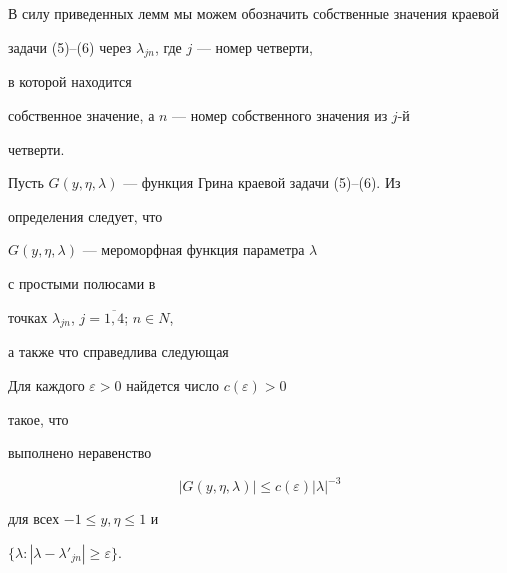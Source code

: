  


В силу приведенных лемм мы можем обозначить собственные значения краевой 


задачи (5)--(6) через $\lambda_{jn}$, где $j$ --- номер четверти, 


в которой находится 


собственное значение, а $n$ --- номер собственного значения из $j$-й 


четверти. 


 


Пусть $G(y,\eta,\lambda)$ --- функция Грина краевой задачи (5)--(6). Из 


определения следует, что 


$G(y,\eta,\lambda)$ --- мероморфная функция параметра $\lambda$ 


с простыми полюсами в 


точках $\lambda_{jn}$, $j=\overline{1,4}$; $n \in N$, 


а также что справедлива следующая 


 


\begin{lem} Для каждого $\varepsilon>0$ найдется число $c(\varepsilon)>0$ 


такое, что 


выполнено неравенство 


\begin{equation} 


|G(y,\eta,\lambda)|\le c(\varepsilon)|\lambda|^{-3} 


\end{equation} 


для всех $-1 \le y,\eta \le 1$ и 


$\{\lambda:|\lambda-\lambda'_{jn}| \ge \varepsilon\}$. 


\end{lem} 


 


